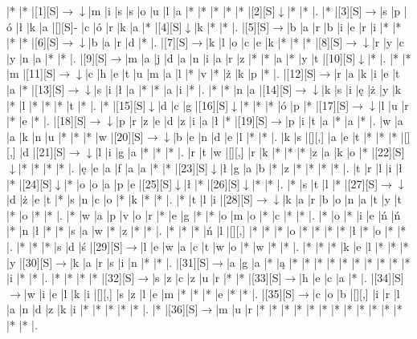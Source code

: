 \documentclass[11pt]{article}
\newcommand\drarr{$\rightarrow \!\!\!\!\! \downarrow$}
\newcommand\rarr{$\rightarrow$}
\newcommand\darr{$\downarrow$}
\begin{document}
\noindent\begin{Puzzle}{18}{26}|*	|*	|[1][S]\drarr	|m	|i	|s	|s	|o	|u	|l	|a	|*	|*	|*	|*	|*	|[2][S]\darr	|*	|*	|.
|*	|[3][S]\rarr	|s	|p	|ó	|ł	|k	|a	|[][S]-	|c	|ó	|r	|k	|a	|*	|[4][S]\darr	|k	|*	|*	|.
|[5][S]\rarr	|b	|a	|r	|b	|i	|e	|r	|i	|*	|*	|*	|*	|[6][S]\drarr	|b	|a	|r	|d	|*	|.
|[7][S]\rarr	|k	|l	|o	|c	|e	|k	|*	|*	|*	|[8][S]\drarr	|r	|y	|c	|y	|n	|a	|*	|*	|.
|[9][S]\rarr	|m	|a	|j	|d	|a	|n	|i	|a	|r	|z	|*	|*	|a	|*	|y	|t	|[10][S]\darr	|*	|.
|*	|*	|m	|[11][S]\drarr	|c	|h	|e	|t	|u	|m	|a	|l	|*	|v	|*	|ż	|k	|p	|*	|.
|[12][S]\rarr	|r	|a	|k	|i	|e	|t	|a	|*	|[13][S]\drarr	|s	|i	|ł	|a	|*	|*	|a	|i	|*	|.
|*	|*	|n	|a	|[14][S]\drarr	|k	|s	|i	|ę	|ż	|y	|k	|*	|l	|*	|*	|*	|t	|*	|.
|*	|[15][S]\darr	|d	|c	|g	|[16][S]\darr	|*	|*	|*	|ó	|p	|*	|[17][S]\drarr	|l	|u	|r	|*	|e	|*	|.
|[18][S]\drarr	|p	|r	|z	|e	|d	|z	|i	|a	|ł	|*	|[19][S]\rarr	|p	|i	|t	|a	|*	|a	|*	|.
|w	|a	|a	|k	|n	|u	|*	|*	|*	|w	|[20][S]\drarr	|b	|e	|n	|d	|e	|l	|*	|*	|.
|k	|s	|[][,]{ }	|a	|e	|t	|*	|*	|*	|[][,]{ }	|d	|[21][S]\drarr	|l	|i	|g	|a	|*	|*	|*	|.
|r	|t	|w	|[][,]{ }	|r	|k	|*	|*	|*	|z	|a	|k	|o	|*	|[22][S]\darr	|*	|*	|*	|*	|.
|ę	|e	|a	|f	|a	|a	|*	|*	|[23][S]\darr	|ł	|g	|a	|b	|*	|z	|*	|*	|*	|*	|.
|t	|r	|l	|i	|ł	|*	|[24][S]\darr	|*	|o	|o	|a	|p	|e	|[25][S]\darr	|ł	|*	|[26][S]\darr	|*	|*	|.
|*	|s	|t	|l	|*	|[27][S]\drarr	|d	|ż	|e	|t	|*	|s	|n	|c	|o	|*	|k	|*	|*	|.
|*	|t	|l	|i	|[28][S]\drarr	|k	|a	|r	|b	|o	|n	|a	|t	|y	|t	|*	|o	|*	|*	|.
|*	|w	|a	|p	|v	|o	|r	|*	|e	|g	|*	|*	|o	|m	|o	|*	|c	|*	|*	|.
|*	|o	|*	|i	|e	|ń	|ń	|*	|n	|ł	|*	|*	|s	|a	|w	|*	|z	|*	|*	|.
|*	|*	|*	|ń	|l	|[][,]{ }	|*	|*	|*	|o	|*	|*	|*	|*	|ł	|*	|o	|*	|*	|.
|*	|*	|*	|s	|d	|ś	|[29][S]\rarr	|l	|e	|w	|a	|c	|t	|w	|o	|*	|w	|*	|*	|.
|*	|*	|*	|k	|e	|l	|*	|*	|*	|y	|[30][S]\rarr	|k	|a	|r	|s	|i	|n	|*	|*	|.
|[31][S]\rarr	|a	|g	|a	|*	|ą	|*	|*	|*	|*	|*	|*	|*	|*	|*	|*	|i	|*	|*	|.
|*	|*	|*	|*	|[32][S]\rarr	|s	|z	|c	|z	|u	|r	|*	|*	|[33][S]\rarr	|h	|e	|c	|a	|*	|.
|[34][S]\rarr	|w	|i	|e	|l	|k	|i	|[][,]{ }	|s	|z	|l	|e	|m	|*	|*	|*	|e	|*	|*	|.
|[35][S]\rarr	|c	|o	|b	|[][,]{ }	|i	|r	|l	|a	|n	|d	|z	|k	|i	|*	|*	|*	|*	|*	|.
|*	|[36][S]\rarr	|m	|u	|r	|*	|*	|*	|*	|*	|*	|*	|*	|*	|*	|*	|*	|*	|*	|.\end{Puzzle}

\newpage
\end{document}
